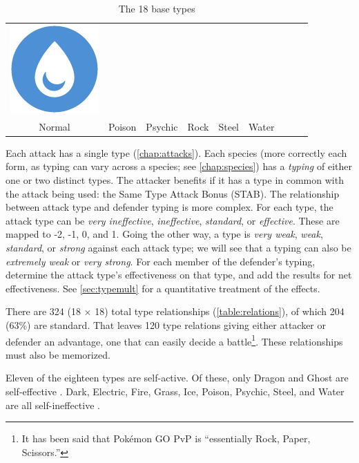 \begin{table}[h!]
\begin{center}
\begin{tabular}{c c c c c c c c c}
  \includegraphics[scale=.25]{images/water.png} \\
  Normal & Poison & Psychic & Rock & Steel & Water \\
\end{tabular}
\end{center}
\caption{The 18 base types}
\end{table}

Each attack has a single type (\autoref{chap:attacks}).
Each species (more correctly each form, as typing can vary across a species; see \autoref{chap:species})
  has a \textit{typing} of either one or two distinct types.
The attacker benefits if it has a type in common with the attack being used:
  the Same Type Attack Bonus (STAB).
The relationship between attack type and defender typing is more complex.
For each type, the attack type can be \textit{very ineffective},
  \textit{ineffective}, \textit{standard}, or \textit{effective}.
These are mapped to -2, -1, 0, and 1.
Going the other way, a type is \textit{very weak}, \textit{weak},
  \textit{standard}, or \textit{strong} against each attack type;
  we will see that a typing can also be \textit{extremely weak} or
  \textit{very strong}.
For each member of the defender's typing, determine the attack type's effectiveness
  on that type, and add the results for net effectiveness.
See \autoref{sec:typemult} for a quantitative treatment of the effects.

There are 324 (18 × 18) total type relationships (\autoref{table:relations}),
  of which 204 (63\%) are standard.
That leaves 120 type relations giving either attacker or defender an advantage,
  one that can easily decide a battle\footnote{It has been said that Pokémon GO PvP is ``essentially Rock, Paper, Scissors.''}.
These relationships must also be memorized.



Eleven of the eighteen types are self-active.
Of these, only Dragon and Ghost are
  self-effective
 .
Dark, Electric, Fire, Grass, Ice, Poison, Psychic,
 Steel, and Water are all self-ineffective%
.

